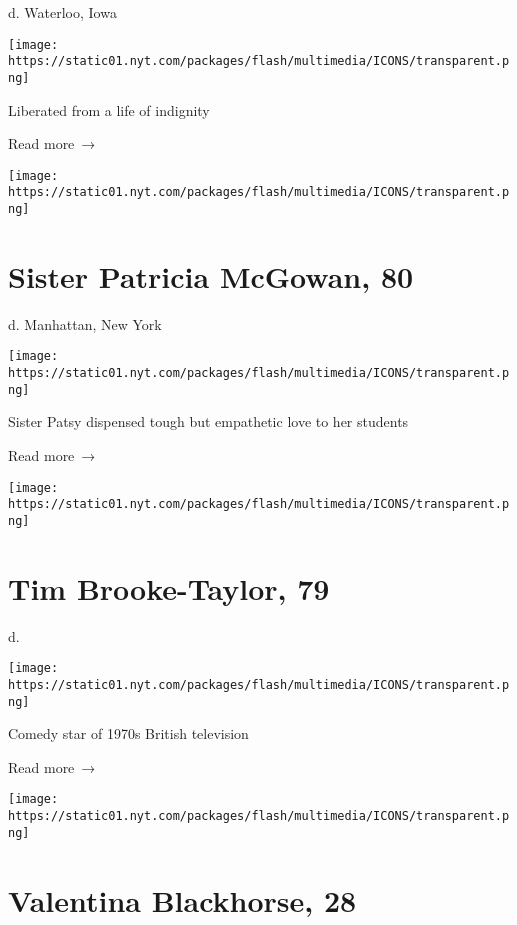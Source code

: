 d. Waterloo, Iowa

\texttt{[image: https://static01.nyt.com/packages/flash/multimedia/ICONS/transparent.png]}

Liberated from a life of indignity

 Read more~→

\href{https://www.nytimes.com/2020/04/30/obituaries/patricia-mcgowan-dead-coronavirus.html}{}

\texttt{[image: https://static01.nyt.com/packages/flash/multimedia/ICONS/transparent.png]}

\hypertarget{sister-patricia-mcgowan-80}{%
\section{Sister Patricia McGowan, 80}\label{sister-patricia-mcgowan-80}}

d. Manhattan, New York

\texttt{[image: https://static01.nyt.com/packages/flash/multimedia/ICONS/transparent.png]}

Sister Patsy dispensed tough but empathetic love to her students

 Read more~→

\href{https://www.nytimes.com/2020/04/30/arts/television/tim-brooke-taylor-dead-coronavirus.html}{}

\texttt{[image: https://static01.nyt.com/packages/flash/multimedia/ICONS/transparent.png]}

\hypertarget{tim-brooke-taylor-79}{%
\section{Tim Brooke-Taylor, 79}\label{tim-brooke-taylor-79}}

d.

\texttt{[image: https://static01.nyt.com/packages/flash/multimedia/ICONS/transparent.png]}

Comedy star of 1970s British television

 Read more~→

\href{https://www.nytimes.com/2020/04/30/obituaries/valentina-blackhorse-dead-coronavirus.html}{}

\texttt{[image: https://static01.nyt.com/packages/flash/multimedia/ICONS/transparent.png]}

\hypertarget{valentina-blackhorse-28}{%
\section{Valentina Blackhorse, 28}\label{valentina-blackhorse-28}}

